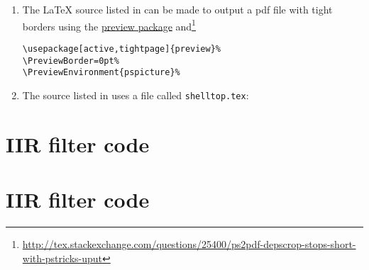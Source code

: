 \begin{enumerate}
  \item \label{item:src_Nriesz_tex} 
        The {\LaTeX} source listed in  can be made to output a pdf file
        with tight borders using the \href{http://www.ctan.org/pkg/preview}{preview package} and\footnote{
\url{http://tex.stackexchange.com/questions/25400/ps2pdf-depscrop-stops-short-with-pstricks-uput}}
\begin{lstlisting}
\usepackage[active,tightpage]{preview}%
\PreviewBorder=0pt%
\PreviewEnvironment{pspicture}%
\end{lstlisting}



  \item \label{item:src_Nriesz_shelltop} 
        The source listed in  uses a file called 
        \lstinline{shelltop.tex}:



\end{enumerate}


\section{IIR filter code}
\label{sec:src_df2_order1_cpp}


\section{IIR filter code}
\label{sec:src_df2_order2_cpp}

